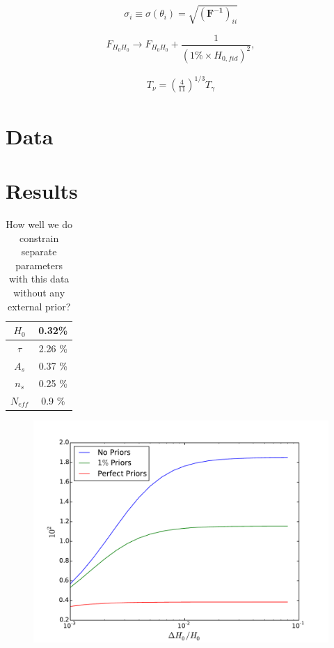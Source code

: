 \documentclass[aps,prl,preprint,groupedaddress]{revtex4-1}
\begin{document}
\begin{equation}
\sigma_i \equiv \sigma (\theta_i) = \sqrt{(\mathbf{ F^{-1}})_{ii}}
\end{equation}

\begin{equation}
F_{H_0 H_0} \rightarrow F_{H_0 H_0} + \frac{1}{(1\% \times H_{0,fid})^2}, 
\end{equation}


\begin{eqnarray}
	T_{\nu} = \left( \frac{4}{11} \right)^{1/3} T_{\gamma} 
	\label{eq:tnu_propto_tgamma}
\end{eqnarray}

\section{Data}
\section{Results}

\begin{table}[htdp]
\caption{How well we do constrain separate parameters with this data without any external prior?}
\begin{center}
\begin{tabular}{|c|c|}
\hline
$H_{0}$ & 0.32\% \\
\hline
\hline
$\tau$ & 2.26 \%\\
\hline

\hline
$A_{s}$ & 0.37 \%\\
\hline

\hline
$n_{s}$ & 0.25 \%\\
\hline

\hline
$N_{eff}$ & 0.9 \%\\
\hline

\end{tabular}
\end{center}
\label{default}
\end{table}%


\begin{figure}[htbp]
\begin{center}
\includegraphics[scale=0.6]{h0_fisher.pdf}
\caption{}
\label{fig:phi-cl-noise}
\end{center}
\end{figure}
\end{document}
